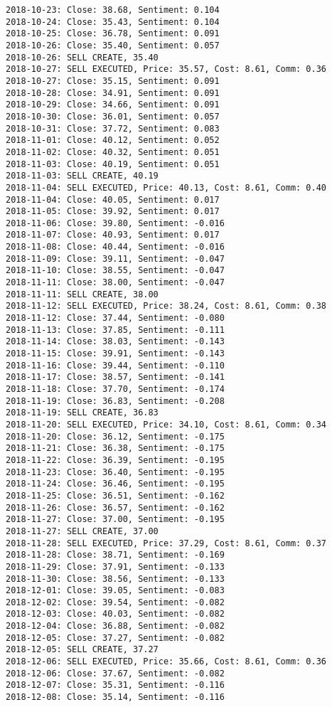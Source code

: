 \documentclass[11pt]{article}
\begin{document}
\begin{Verbatim}[commandchars=\\\{\}]
2018-10-23: Close: 38.68, Sentiment: 0.104
2018-10-24: Close: 35.43, Sentiment: 0.104
2018-10-25: Close: 36.78, Sentiment: 0.091
2018-10-26: Close: 35.40, Sentiment: 0.057
2018-10-26: SELL CREATE, 35.40
2018-10-27: SELL EXECUTED, Price: 35.57, Cost: 8.61, Comm: 0.36
2018-10-27: Close: 35.15, Sentiment: 0.091
2018-10-28: Close: 34.91, Sentiment: 0.091
2018-10-29: Close: 34.66, Sentiment: 0.091
2018-10-30: Close: 36.01, Sentiment: 0.057
2018-10-31: Close: 37.72, Sentiment: 0.083
2018-11-01: Close: 40.12, Sentiment: 0.052
2018-11-02: Close: 40.32, Sentiment: 0.051
2018-11-03: Close: 40.19, Sentiment: 0.051
2018-11-03: SELL CREATE, 40.19
2018-11-04: SELL EXECUTED, Price: 40.13, Cost: 8.61, Comm: 0.40
2018-11-04: Close: 40.05, Sentiment: 0.017
2018-11-05: Close: 39.92, Sentiment: 0.017
2018-11-06: Close: 39.80, Sentiment: -0.016
2018-11-07: Close: 40.93, Sentiment: 0.017
2018-11-08: Close: 40.44, Sentiment: -0.016
2018-11-09: Close: 39.11, Sentiment: -0.047
2018-11-10: Close: 38.55, Sentiment: -0.047
2018-11-11: Close: 38.00, Sentiment: -0.047
2018-11-11: SELL CREATE, 38.00
2018-11-12: SELL EXECUTED, Price: 38.24, Cost: 8.61, Comm: 0.38
2018-11-12: Close: 37.44, Sentiment: -0.080
2018-11-13: Close: 37.85, Sentiment: -0.111
2018-11-14: Close: 38.03, Sentiment: -0.143
2018-11-15: Close: 39.91, Sentiment: -0.143
2018-11-16: Close: 39.44, Sentiment: -0.110
2018-11-17: Close: 38.57, Sentiment: -0.141
2018-11-18: Close: 37.70, Sentiment: -0.174
2018-11-19: Close: 36.83, Sentiment: -0.208
2018-11-19: SELL CREATE, 36.83
2018-11-20: SELL EXECUTED, Price: 34.10, Cost: 8.61, Comm: 0.34
2018-11-20: Close: 36.12, Sentiment: -0.175
2018-11-21: Close: 36.38, Sentiment: -0.175
2018-11-22: Close: 36.39, Sentiment: -0.195
2018-11-23: Close: 36.40, Sentiment: -0.195
2018-11-24: Close: 36.46, Sentiment: -0.195
2018-11-25: Close: 36.51, Sentiment: -0.162
2018-11-26: Close: 36.57, Sentiment: -0.162
2018-11-27: Close: 37.00, Sentiment: -0.195
2018-11-27: SELL CREATE, 37.00
2018-11-28: SELL EXECUTED, Price: 37.29, Cost: 8.61, Comm: 0.37
2018-11-28: Close: 38.71, Sentiment: -0.169
2018-11-29: Close: 37.91, Sentiment: -0.133
2018-11-30: Close: 38.56, Sentiment: -0.133
2018-12-01: Close: 39.05, Sentiment: -0.083
2018-12-02: Close: 39.54, Sentiment: -0.082
2018-12-03: Close: 40.03, Sentiment: -0.082
2018-12-04: Close: 36.88, Sentiment: -0.082
2018-12-05: Close: 37.27, Sentiment: -0.082
2018-12-05: SELL CREATE, 37.27
2018-12-06: SELL EXECUTED, Price: 35.66, Cost: 8.61, Comm: 0.36
2018-12-06: Close: 37.67, Sentiment: -0.082
2018-12-07: Close: 35.31, Sentiment: -0.116
2018-12-08: Close: 35.14, Sentiment: -0.116

\end{Verbatim}
\end{document}
